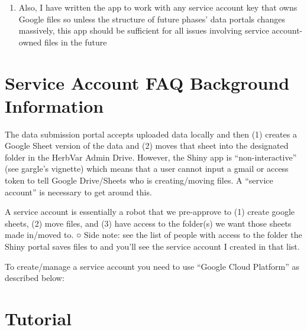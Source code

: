 \documentclass[
  letterpaper,
  oneside,
  open=any]{scrbook}
\providecommand{\tightlist}{%
  \setlength{\itemsep}{0pt}\setlength{\parskip}{0pt}}\usepackage{longtable,booktabs,array}
\begin{document}
\begin{enumerate}
\def\labelenumi{\arabic{enumi}.}
\setcounter{enumi}{6}
\tightlist
\item
  Also, I have written the app to work with any service account key that
  owns Google files so unless the structure of future phases' data
  portals changes massively, this app should be sufficient for all
  issues involving service account-owned files in the future
\end{enumerate}

\section{Service Account FAQ Background
Information}\label{service-account-faq-background-information}

The data submission portal accepts uploaded data locally and then (1)
creates a Google Sheet version of the data and (2) moves that sheet into
the designated folder in the HerbVar Admin Drive. However, the Shiny app
is ``non-interactive'' (see gargle's vignette) which means that a user
cannot input a gmail or access token to tell Google Drive/Sheets who is
creating/moving files. A ``service account'' is necessary to get around
this.

A service account is essentially a robot that we pre-approve to (1)
create google sheets, (2) move files, and (3) have access to the
folder(s) we want those sheets made in/moved to. ○ Side note: see the
list of people with access to the folder the Shiny portal saves files to
and you'll see the service account I created in that list.

To create/manage a service account you need to use ``Google Cloud
Platform'' as described below:

\section{Tutorial}\label{tutorial}
\end{document}

